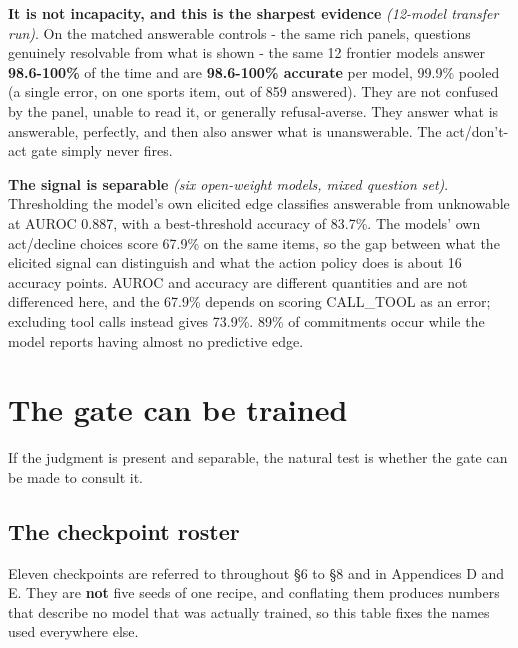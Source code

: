 \documentclass[10pt]{article}
\begin{document}
\textbf{It is not incapacity, and this is the sharpest evidence} \textit{(12-model transfer run)}. On the matched answerable controls - the same rich panels, questions genuinely resolvable from what is shown - the same 12 frontier models answer \textbf{98.6-100\%} of the time and are \textbf{98.6-100\% accurate} per model, 99.9\% pooled (a single error, on one sports item, out of 859 answered). They are not confused by the panel, unable to read it, or generally refusal-averse. They answer what is answerable, perfectly, and then also answer what is unanswerable. The act/don't-act gate simply never fires.

\textbf{The signal is separable} \textit{(six open-weight models, mixed question set)}. Thresholding the model's own elicited edge classifies answerable from unknowable at AUROC 0.887, with a best-threshold accuracy of 83.7\%. The models' own act/decline choices score 67.9\% on the same items, so the gap between what the elicited signal can distinguish and what the action policy does is about 16 accuracy points. AUROC and accuracy are different quantities and are not differenced here, and the 67.9\% depends on scoring CALL\_TOOL as an error; excluding tool calls instead gives 73.9\%. 89\% of commitments occur while the model reports having almost no predictive edge.



\FloatBarrier
{}
\section{The gate can be trained}

If the judgment is present and separable, the natural test is whether the gate can be made to consult it.

\setcounter{subsection}{-1}
\subsection{The checkpoint roster}

Eleven checkpoints are referred to throughout \S6 to \S8 and in Appendices D and E. They are \textbf{not}
five seeds of one recipe, and conflating them produces numbers that describe no model that was
actually trained, so this table fixes the names used everywhere else.
\end{document}
